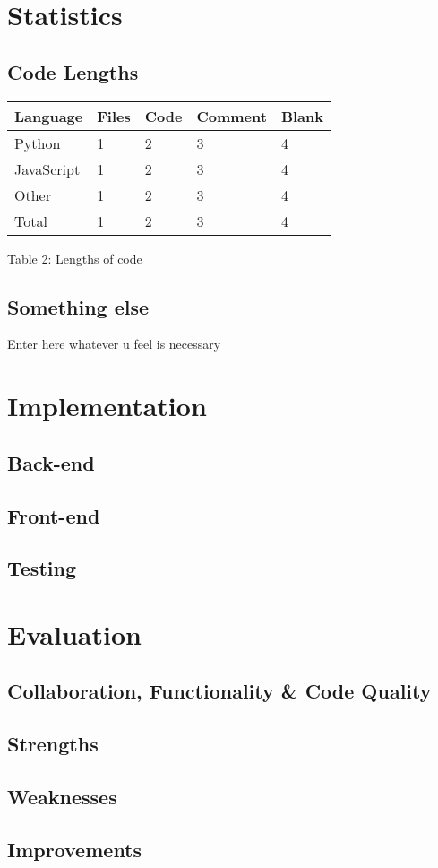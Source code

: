 \documentclass{article}
\begin{document}
\section{Statistics}
\subsection{Code Lengths}
\begin{tabularx}{\textwidth}{|X|X|X|X|X|}
\hline 
Language & Files & Code & Comment & Blank\\
\hline
\hline
Python & 1 & 2 & 3 & 4\\
\hline
JavaScript & 1 & 2 & 3 & 4\\
\hline
Other & 1 & 2 & 3 & 4\\
\hline
\hline
Total & 1 & 2 & 3 & 4\\
\hline
\end{tabularx}
\caption{\label{tab:table-name}Table 2: Lengths of code}

\subsection{Something else}
Enter here whatever u feel is necessary
\clearpage



\section{Implementation}
\subsection{Back-end}
\subsection{Front-end}
\subsection{Testing}
\clearpage



\section{Evaluation}
\subsection{Collaboration, Functionality \& Code Quality}
\subsection{Strengths}
\subsection{Weaknesses}
\subsection{Improvements}
\clearpage
\end{document}
